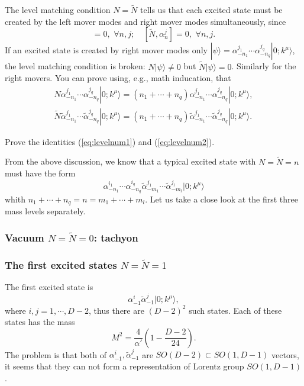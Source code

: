 \documentclass[graybox,envcountchap,sectrefs]{svmono}
\begin{document}
The level matching condition $N=\tilde{N}$ tells us that each excited state must be created by the left mover modes and right mover modes simultaneously, since 
\begin{equation}
[N,\tilde{\alpha}_n^j]=0, \,\,\forall n,j; \quad	[\tilde{N},{\alpha}_n^j]=0, \,\,\forall n,j.
\end{equation}
 If an excited state is created by right mover modes only $|\psi\rangle=\alpha_{-n_1}^{j_1}\cdots \alpha_{-n_q}^{j_q}|0;k^{\mu}\rangle$,
  the level matching condition is broken:
 $N|\psi\rangle \neq  0$ but $\tilde{N}|\psi\rangle=0$. Similarly for the right movers.
 You can prove using, e.g., math inducation, that 
 \begin{align}
 N\alpha_{-n_1}^{j_1}\cdots \alpha_{-n_q}^{j_q}|0;k^{\mu}\rangle=(n_1+\cdots +n_q)	\alpha_{-n_1}^{j_1}\cdots \alpha_{-n_q}^{j_q}|0;k^{\mu}\rangle ,\label{eq:levelnum1}\\
  \tilde{N}\tilde{\alpha}_{-n_1}^{j_1}\cdots \tilde{\alpha}_{-n_q}^{j_q}|0;k^{\mu}\rangle=(n_1+\cdots +n_q)\tilde{\alpha}_{-n_1}^{j_1}\cdots \tilde{\alpha}_{-n_q}^{j_q}|0;k^{\mu}\rangle .\label{eq:levelnum2}
 \end{align}
\begin{exercise}
	Prove the identities (\ref{eq:levelnum1}) and (\ref{eq:levelnum2}).	
\end{exercise}
From the above discussion, we know that a typical excited state with $N=\tilde{N}=n$ must have the form
\begin{equation}
	\alpha_{-n_1}^{i_1}\cdots \alpha_{-n_q}^{i_q}\tilde{\alpha}_{-m_1}^{j_1}\cdots \tilde{\alpha}_{-m_l}^{j_l}|0;k^{\mu}\rangle
\end{equation}
whith $n_1+\cdots +n_q=n=m_1+\cdots+m_l$.
Let us take a close look at the first three mass levels separately.

\subsubsection*{Vacuum $N=\tilde{N}=0$: tachyon}


\subsubsection*{The first excited states $N=\tilde{N}=1$}
 The first excited state is 
\begin{equation}
\alpha_{-1}^i\tilde{\alpha}_{-1}^j|0;k^{\mu}\rangle,	
\end{equation}
where $i,j=1,\cdots ,D-2$, thus there are $(D-2)^2$ such states. Each of these states has the mass
\begin{equation}\label{eq:massless}
	M^2=\frac{4}{\alpha'}(1-\frac{D-2}{24}).
\end{equation}
The problem is that both of $\alpha_{-1}^i,\tilde{\alpha}_{-1}^j$ are $SO(D-2)\subset SO(1,D-1)$ vectors, it seems that they can not form a representation of Lorentz group $SO(1,D-1)$.
\end{document}
